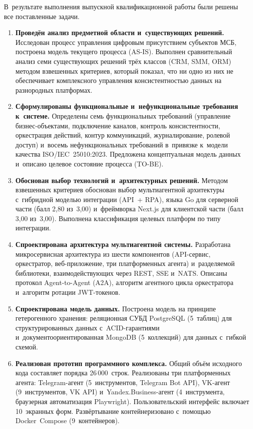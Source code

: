 \Conclusion

В~результате выполнения выпускной квалификационной работы были решены все поставленные задачи.

\begin{enumerate}
  \item \textbf{Проведён анализ предметной области и~существующих решений.} Исследован процесс управления цифровым присутствием субъектов МСБ, построена модель текущего процесса (AS-IS). Выполнен сравнительный анализ семи существующих решений трёх классов (CRM, SMM, ORM) методом взвешенных критериев, который показал, что ни одно из них не обеспечивает комплексного управления консистентностью данных на разнородных платформах.

  \item \textbf{Сформулированы функциональные и~нефункциональные требования к~системе.} Определены семь функциональных требований (управление бизнес-объектами, подключение каналов, контроль консистентности, оркестрация действий, контур коммуникаций, журналирование, ролевой доступ) и~восемь нефункциональных требований в~привязке к~модели качества ISO/IEC~25010:2023. Предложена концептуальная модель данных и~описано целевое состояние процесса (TO-BE).

  \item \textbf{Обоснован выбор технологий и~архитектурных решений.} Методом взвешенных критериев обоснован выбор мультиагентной архитектуры с~гибридной моделью интеграции (API~+ RPA), языка Go для серверной части (балл 2{,}80 из~3{,}00) и~фреймворка Next.js для клиентской части (балл 3{,}00 из~3{,}00). Выполнена классификация целевых платформ по типу интеграции.

  \item \textbf{Спроектирована архитектура мультиагентной системы.} Разработана микросервисная архитектура из шести компонентов (API-сервис, оркестратор, веб-приложение, три платформенных агента) и~разделяемой библиотеки, взаимодействующих через REST, SSE и~NATS. Описаны протокол Agent-to-Agent (A2A), алгоритм агентного цикла оркестратора и~алгоритм ротации JWT-токенов.

  \item \textbf{Спроектирована модель данных.} Построена модель на принципе гетерогенного хранения: реляционная СУБД PostgreSQL (5~таблиц) для структурированных данных с~ACID-гарантиями и~документоориентированная MongoDB (5~коллекций) для данных с~гибкой схемой.

  \item \textbf{Реализован прототип программного комплекса.} Общий объём исходного кода составляет порядка 26\,000~строк. Реализованы три платформенных агента: Telegram-агент (5~инструментов, Telegram Bot API), VK-агент (9~инструментов, VK API) и~Yandex.Business-агент (4~инструмента, браузерная автоматизация Playwright). Пользовательский интерфейс включает 10~экранных форм. Развёртывание контейнеризовано с~помощью Docker~Compose (9~контейнеров).


\end{enumerate}
